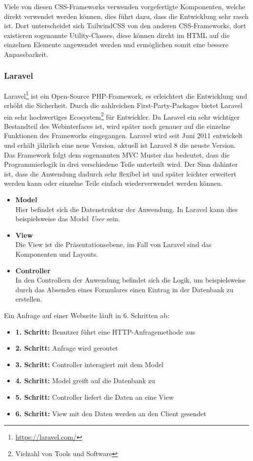Viele von diesen CSS-Frameworks verwenden vorgefertigte Komponenten, welche direkt
verwendet werden können, dies führt dazu, dass die Entwicklung sehr rasch ist.
Dort unterscheidet sich TailwindCSS von den anderen CSS-Frameworks, dort
existieren sogenannte Utility-Classes, diese können direkt im \acs*{HTML} auf
die einzelnen Elemente angewendet werden und ermöglichen somit eine bessere Anpassbarkeit.

\subsubsection{Laravel}
Laravel\footnote{\url{https://laravel.com/}} ist ein Open-Source PHP-Framework,
es erleichtert die Entwicklung und erhöht die Sicherheit. Durch die
zahlreichen First-Party-Packages bietet Laravel ein sehr hochwertiges
Ecosystem\footnote{Vielzahl von Tools und Software}
für Entwickler.
Da Laravel ein sehr wichtiger Bestandteil des Webinterfaces ist, wird später noch
genauer auf die einzelne Funktionen des Frameworks eingegangen. Laravel wird
seit Juni 2011 entwickelt und erhält jährlich eine neue Version, aktuell ist
Laravel 8 die neuste Version.\\

Das Framework folgt dem sogenannten \ac*{MVC} Muster das bedeutet, dass die
Programmierlogik in drei verschiedene Teile unterteilt wird. Der Sinn dahinter
ist, dass die Anwendung dadurch sehr flexibel ist und später leichter erweitert
werden kann oder einzelne Teile einfach wiederverwendet werden können.

\begin{itemize}
  \item \textbf{Model} \\
  Hier befindet sich die Datenstruktur der Anwendung. In Laravel kann dies
  beispielsweise das Model \textit{User} sein.
  \item \textbf{View} \\
  Die View ist die Präsentationsebene, im Fall von Laravel sind das
  Komponenten und Layouts.
  \item \textbf{Controller} \\
  In den Controllern der Anwendung befindet sich die Logik, um beispielsweise
  durch das Absenden eines Formulares einen Eintrag in der Datenbank zu
  erstellen. 
\end{itemize}

Ein Anfrage auf einer Webseite läuft in 6. Schritten ab:

\begin{itemize}
  \item \textbf{1. Schritt:} Benutzer führt eine HTTP-Anfragemethode aus
  \item \textbf{2. Schritt:} Anfrage wird geroutet
  \item \textbf{3. Schritt:} Controller interagiert mit dem Model
  \item \textbf{4. Schritt:} Model greift auf die Datenbank zu
  \item \textbf{5. Schritt:} Controller liefert die Daten an eine View
  \item \textbf{6. Schritt:} View mit den Daten werden an den Client gesendet
\end{itemize}

